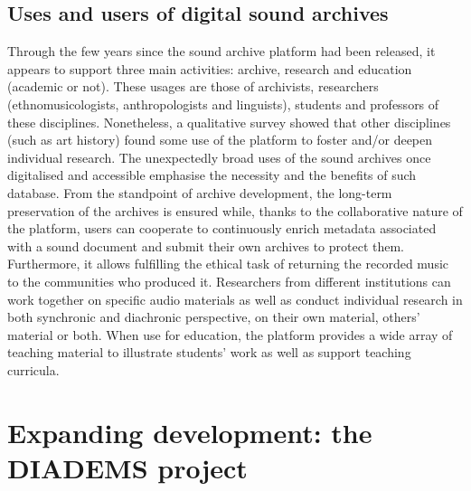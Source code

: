 \documentclass{sig-alternate}
\begin{document}
\subsection{Uses and users of digital sound archives}
     Through the few years since the sound archive platform had been released, it appears to support three main activities: archive, research and education (academic or not). These usages are those of archivists, researchers (ethnomusicologists, anthropologists and linguists), students and professors of these disciplines. Nonetheless, a qualitative survey showed that other disciplines (such as art history) found some use of the platform to foster and/or deepen individual research. The unexpectedly broad uses of the sound archives once digitalised and accessible emphasise the necessity and the benefits of such database.
From the standpoint of archive development, the long-term preservation of the archives is ensured while, thanks to the collaborative nature of the platform, users can cooperate to continuously enrich metadata associated with a sound document and submit their own archives to protect them. Furthermore, it allows fulfilling the ethical task of returning the recorded music to the communities who produced it.
Researchers from different institutions can work together on specific audio materials as well as conduct individual research in both synchronic and diachronic perspective, on their own material, others’ material or both.
When use for education, the platform provides a wide array of teaching material to illustrate students’ work as well as support teaching curricula.



\section{Expanding development: the DIADEMS project}\label{sec:Diadems}
\end{document}
